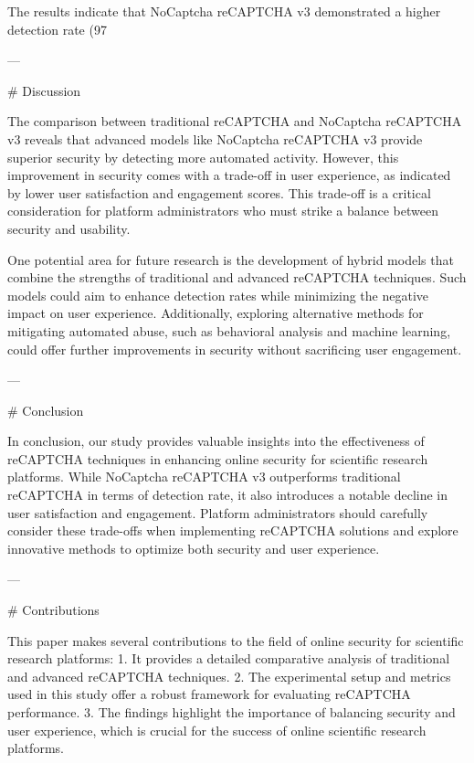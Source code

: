 The results indicate that NoCaptcha reCAPTCHA v3 demonstrated a higher detection rate (97%

---

# Discussion

The comparison between traditional reCAPTCHA and NoCaptcha reCAPTCHA v3 reveals that advanced models like NoCaptcha reCAPTCHA v3 provide superior security by detecting more automated activity. However, this improvement in security comes with a trade-off in user experience, as indicated by lower user satisfaction and engagement scores. This trade-off is a critical consideration for platform administrators who must strike a balance between security and usability.

One potential area for future research is the development of hybrid models that combine the strengths of traditional and advanced reCAPTCHA techniques. Such models could aim to enhance detection rates while minimizing the negative impact on user experience. Additionally, exploring alternative methods for mitigating automated abuse, such as behavioral analysis and machine learning, could offer further improvements in security without sacrificing user engagement.

---

# Conclusion

In conclusion, our study provides valuable insights into the effectiveness of reCAPTCHA techniques in enhancing online security for scientific research platforms. While NoCaptcha reCAPTCHA v3 outperforms traditional reCAPTCHA in terms of detection rate, it also introduces a notable decline in user satisfaction and engagement. Platform administrators should carefully consider these trade-offs when implementing reCAPTCHA solutions and explore innovative methods to optimize both security and user experience.

---

# Contributions

This paper makes several contributions to the field of online security for scientific research platforms:
1. It provides a detailed comparative analysis of traditional and advanced reCAPTCHA techniques.
2. The experimental setup and metrics used in this study offer a robust framework for evaluating reCAPTCHA performance.
3. The findings highlight the importance of balancing security and user experience, which is crucial for the success of online scientific research platforms.

